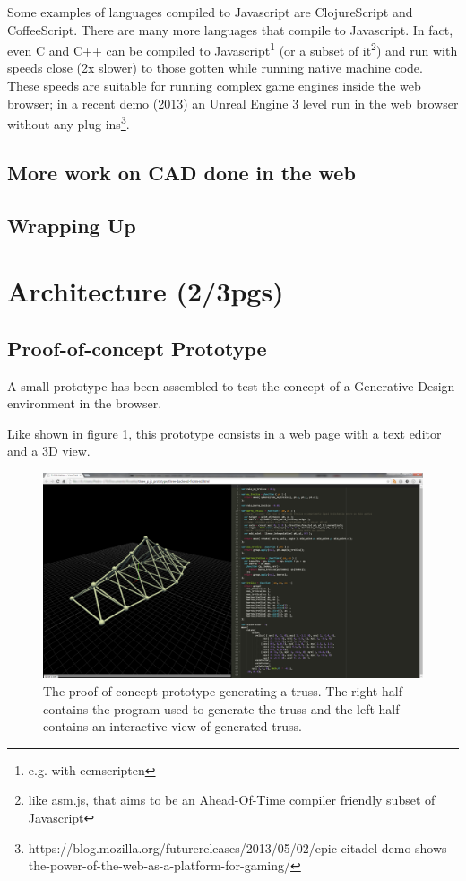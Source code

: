 \documentclass{./llncs2e/llncs}
\begin{document}
	Some examples of languages compiled to Javascript are ClojureScript and CoffeeScript. There are many more languages that compile to Javascript. In fact, even C and C++ can be compiled to Javascript\footnote{e.g. with ecmscripten} (or a subset of it\footnote{like asm.js, that aims to be an Ahead-Of-Time compiler friendly subset of Javascript}) and run with speeds close (2x slower) to those gotten while running native machine code. These speeds are suitable for running complex game engines inside the web browser; in a recent demo (2013) an Unreal Engine 3 level run in the web browser without any plug-ins\footnote{https://blog.mozilla.org/futurereleases/2013/05/02/epic-citadel-demo-shows-the-power-of-the-web-as-a-platform-for-gaming/}.


\subsection{More work on CAD done in the web}


\subsection{Wrapping Up}

\section{Architecture (2/3pgs)}
\subsection{Proof-of-concept Prototype}
	A small prototype has been assembled to test the concept of a Generative Design environment in the browser.

	Like shown in figure \ref{fig:proto:3d:p:editor}, this prototype consists in a web page with a text editor and a 3D view.

	\begin{figure}
	  \centering
	  \includegraphics[width=1.0\textwidth]{img/proto_3d_p_editor}
	    \caption{The proof-of-concept prototype generating a truss. The right half contains the program used to generate the truss and the left half contains an interactive view of generated truss.}
	  \label{fig:proto:3d:p:editor}
	\end{figure} 
\end{document}
